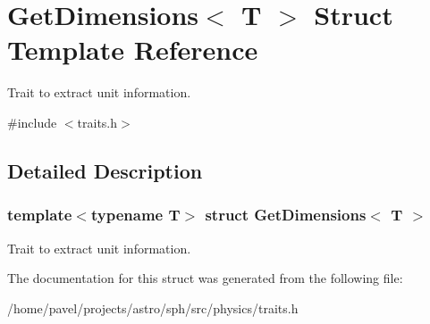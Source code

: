 \hypertarget{structGetDimensions}{}\section{Get\+Dimensions$<$ T $>$ Struct Template Reference}
\label{structGetDimensions}


Trait to extract unit information.  




{\ttfamily \#include $<$traits.\+h$>$}



\subsection{Detailed Description}
\subsubsection*{template$<$typename T$>$\newline
struct Get\+Dimensions$<$ T $>$}

Trait to extract unit information. 

The documentation for this struct was generated from the following file\+:\begin{DoxyCompactItemize}
\item 
/home/pavel/projects/astro/sph/src/physics/traits.\+h\end{DoxyCompactItemize}
